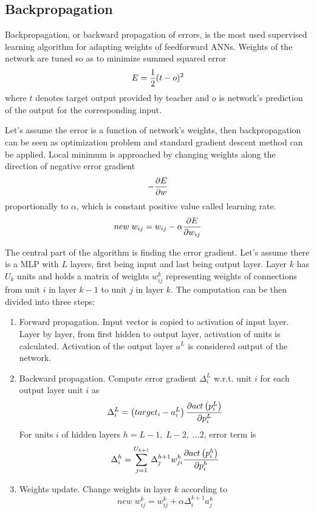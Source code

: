 \documentclass[12pt,oneside]{fithesis2}
\begin{document}
\subsection{Backpropagation}
Backpropagation, or backward propagation of errors, is the most used supervised learning algorithm for adapting weights of feedforward ANNs. Weights of the network are tuned so as to minimize summed squared error
$$E = {1 \over 2}(t - o)^2$$
where $t$ denotes target output provided by teacher and $o$ is network's prediction of the output for the corresponding input. \par
Let's assume the error is a function of network's weights, then backpropagation can be seen as optimization problem and standard gradient descent method can be applied. Local minimum is approached by changing weights along the direction of negative error gradient 
$$-{{\partial E} \over {\partial w}}$$
proportionally to $\alpha$, which is constant positive value called learning rate.
$$new \; w_{ij} = w_{ij} - \alpha {{\partial E} \over {\partial w_{ij}}}$$

The central part of the algorithm is finding the error gradient. Let's assume there is a MLP with $L$ layers, first being input and last being output layer. Layer $k$ has $U_k$ units and holds a matrix of weights $w_{ij}^k$ representing weights of connections from unit $i$ in layer $k - 1$ to unit $j$ in layer $k$. The computation can be then divided into three steps:

\begin{enumerate}
  \item Forward propagation. Input vector is copied to activation of input layer. Layer by layer, from first hidden to output layer, activation of units is calculated. Activation of the output layer $a^L$ is considered output of the network.
  
  \item Backward propagation. Compute error gradient $\Delta^L_i$ w.r.t. unit $i$ for each output layer unit $i$ as
  $$\Delta^L_i = \left(target_i - a^L_i\right){{\partial{act\left(p^L_i\right)}} \over {\partial p^L_i}}$$
  For units $i$ of hidden layers $h = L-1,\; L-2,\;  \dots 2$, error term is
  $$\Delta^h_i = \sum\limits_{j=1}^{U_{h + 1}} \Delta_{j}^{h+1}w_{ji}^{h} {{\partial{act\left(p^h_i\right)}} \over {\partial p^h_i}}$$
  
  \item Weights update. Change weights in layer $k$ according to
  $$new \; w_{ij}^k = w_{ij}^k + \alpha \Delta_i^{k+1} a_{j}^{k}$$

\end{enumerate}
\end{document}
